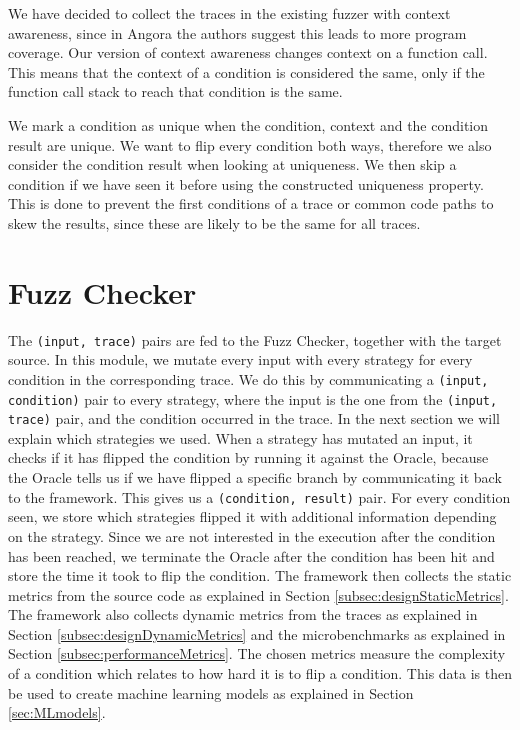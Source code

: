 We have decided to collect the traces in the existing fuzzer with context awareness, since in Angora \cite{chen2018angora} the authors suggest this leads to more program coverage. Our version of context awareness changes context on a function call. This means that the context of a condition is considered the same, only if the function call stack to reach that condition is the same.

We mark a condition as unique when the condition, context and the condition result are unique. We want to flip every condition both ways, therefore we also consider the condition result when looking at uniqueness. We then skip a condition if we have seen it before using the constructed uniqueness property. This is done to prevent the first conditions of a trace or common code paths to skew the results, since these are likely to be the same for all traces.


\section{Fuzz Checker}
The \texttt{(input, trace)} pairs are fed to the Fuzz Checker, together with the target source. In this module, we mutate every input with every strategy for every condition in the corresponding trace. We do this by communicating a \texttt{(input, condition)} pair to every strategy, where the input is the one from the \texttt{(input, trace)} pair, and the condition occurred in the trace. In the next section we will explain which strategies we used. When a strategy has mutated an input, it checks if it has flipped the condition by running it against the Oracle, because the Oracle tells us if we have flipped a specific branch by communicating it back to the framework. This gives us a \texttt{(condition, result)} pair. For every condition seen, we store which strategies flipped it with additional information depending on the strategy. Since we are not interested in the execution after the condition has been reached, we terminate the Oracle after the condition has been hit and store the time it took to flip the condition. The framework then collects the static metrics from the source code as explained in Section \ref{subsec:designStaticMetrics}. The framework also collects dynamic metrics from the traces as explained in Section \ref{subsec:designDynamicMetrics} and the microbenchmarks as explained in Section \ref{subsec:performanceMetrics}. The chosen metrics measure the complexity of a condition which relates to how hard it is to flip a condition. This data is then be used to create machine learning models as explained in Section \ref{sec:MLmodels}. 

